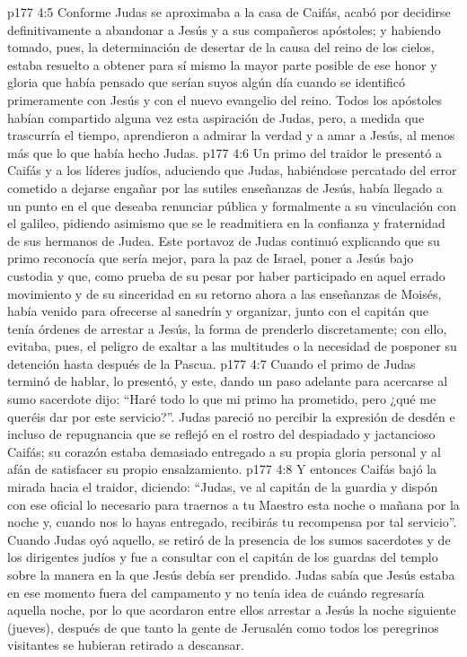 \vs p177 4:5 Conforme Judas se aproximaba a la casa de Caifás, acabó por decidirse definitivamente a abandonar a Jesús y a sus compañeros apóstoles; y habiendo tomado, pues, la determinación de desertar de la causa del reino de los cielos, estaba resuelto a obtener para sí mismo la mayor parte posible de ese honor y gloria que había pensado que serían suyos algún día cuando se identificó primeramente con Jesús y con el nuevo evangelio del reino. Todos los apóstoles habían compartido alguna vez esta aspiración de Judas, pero, a medida que trascurría el tiempo, aprendieron a admirar la verdad y a amar a Jesús, al menos más que lo que había hecho Judas.
\vs p177 4:6 Un primo del traidor le presentó a Caifás y a los líderes judíos, aduciendo que Judas, habiéndose percatado del error cometido a dejarse engañar por las sutiles enseñanzas de Jesús, había llegado a un punto en el que deseaba renunciar pública y formalmente a su vinculación con el galileo, pidiendo asimismo que se le readmitiera en la confianza y fraternidad de sus hermanos de Judea. Este portavoz de Judas continuó explicando que su primo reconocía que sería mejor, para la paz de Israel, poner a Jesús bajo custodia y que, como prueba de su pesar por haber participado en aquel errado movimiento y de su sinceridad en su retorno ahora a las enseñanzas de Moisés, había venido para ofrecerse al sanedrín y organizar, junto con el capitán que tenía órdenes de arrestar a Jesús, la forma de prenderlo discretamente; con ello, evitaba, pues, el peligro de exaltar a las multitudes o la necesidad de posponer su detención hasta después de la Pascua.
\vs p177 4:7 Cuando el primo de Judas terminó de hablar, lo presentó, y este, dando un paso adelante para acercarse al sumo sacerdote dijo: “Haré todo lo que mi primo ha prometido, pero ¿qué me queréis dar por este servicio?”. Judas pareció no percibir la expresión de desdén e incluso de repugnancia que se reflejó en el rostro del despiadado y jactancioso Caifás; su corazón estaba demasiado entregado a su propia gloria personal y al afán de satisfacer su propio ensalzamiento.
\vs p177 4:8 Y entonces Caifás bajó la mirada hacia el traidor, diciendo: “Judas, ve al capitán de la guardia y dispón con ese oficial lo necesario para traernos a tu Maestro esta noche o mañana por la noche y, cuando nos lo hayas entregado, recibirás tu recompensa por tal servicio”. Cuando Judas oyó aquello, se retiró de la presencia de los sumos sacerdotes y de los dirigentes judíos y fue a consultar con el capitán de los guardas del templo sobre la manera en la que Jesús debía ser prendido. Judas sabía que Jesús estaba en ese momento fuera del campamento y no tenía idea de cuándo regresaría aquella noche, por lo que acordaron entre ellos arrestar a Jesús la noche siguiente (jueves), después de que tanto la gente de Jerusalén como todos los peregrinos visitantes se hubieran retirado a descansar.
